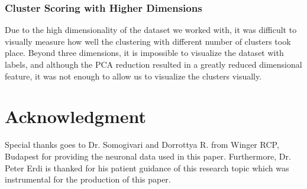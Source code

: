 \documentclass[journal,12pt,onecolumn,draftclsnofoot]{IEEEtran}  %
\begin{document}
\subsubsection{Cluster Scoring with Higher Dimensions}
Due to the high dimensionality of the dataset we worked with, it was difficult to visually measure how well the clustering with different number of clusters took place. Beyond three dimensions, it is impossible to visualize the dataset with labels, and although the PCA reduction resulted in a greatly reduced dimensional feature, it was not enough to allow us to visualize the clusters visually.


















\section*{Acknowledgment}
Special thanks goes to Dr. Somogivari and Dorrottya R. from Winger RCP, Budapest for providing the neuronal data used in this paper. Furthermore, Dr. Peter Erdi is thanked for his patient guidance of this research topic which was instrumental for the production of this paper.
\balance


\end{document}
